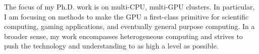 The focus of my Ph.D. work is on multi-CPU, multi-GPU clusters. In  particular,
I am focusing on methods to make the GPU a first-class primitive for scientific
computing, gaming applications, and eventually  general purpose computing. In a
broader sense, my work encompasses heterogeneous computing and strives to push
the technology and  understanding to as high a level as possible.
